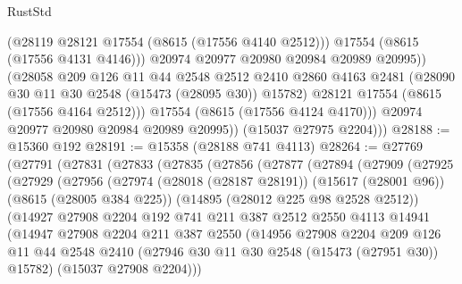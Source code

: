 \begin{lexlean}{RustStd}
\begin{coremodule}
                    (@28119 @28121 @17554 (@8615 (@17556 @4140 @2512)))
                    @17554
                    (@8615 (@17556 @4131 @4146)))
                  @20974
                  @20977
                  @20980
                  @20984
                  @20989
                  @20995))
              (@28058
                @209
                @126
                @11
                @44
                @2548
                @2512
                @2410
                @2860
                @4163
                @2481
                (@28090 @30 @11 @30 @2548 (@15473 (@28095 @30)) @15782)
                @28121
                @17554
                (@8615 (@17556 @4164 @2512)))
              @17554
              (@8615 (@17556 @4124 @4170)))
            @20974
            @20977
            @20980
            @20984
            @20989
            @20995))
        (@15037 @27975 @2204)))
@28188 := @15360 @192
@28191 := @15358 (@28188 @741 @4113)
@28264 := @27769
    (@27791
      (@27831
        (@27833
          (@27835
            (@27856
              (@27877
                (@27894
                  (@27909
                    (@27925
                      (@27929
                        (@27956
                          (@27974
                            (@28018 (@28187 @28191))
                            (@15617 (@28001 @96))
                            (@8615 (@28005 @384 @225))
                            (@14895 (@28012 @225 @98 @2528 @2512))
                            (@14927
                              @27908
                              @2204
                              @192
                              @741
                              @211
                              @387
                              @2512
                              @2550
                              @4113
                              @14941
                              (@14947
                                @27908
                                @2204
                                @211
                                @387
                                @2550
                                (@14956
                                  @27908
                                  @2204
                                  @209
                                  @126
                                  @11
                                  @44
                                  @2548
                                  @2410
                                  (@27946 @30 @11 @30 @2548 (@15473 (@27951 @30)) @15782)
                                  (@15037 @27908 @2204)))

\end{coremodule}
\end{lexlean}
